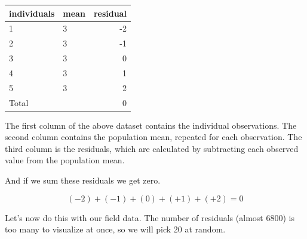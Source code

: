\documentclass[
]{book}
\newenvironment{Shaded}{\begin{snugshade}}{\end{snugshade}}
\newcommand{\AttributeTok}[1]{\textcolor[rgb]{0.77,0.63,0.00}{#1}}
\newcommand{\DecValTok}[1]{\textcolor[rgb]{0.00,0.00,0.81}{#1}}
\newcommand{\FunctionTok}[1]{\textcolor[rgb]{0.00,0.00,0.00}{#1}}
\newcommand{\NormalTok}[1]{#1}
\newcommand{\OtherTok}[1]{\textcolor[rgb]{0.56,0.35,0.01}{#1}}
\newcommand{\SpecialCharTok}[1]{\textcolor[rgb]{0.00,0.00,0.00}{#1}}
\newcommand{\StringTok}[1]{\textcolor[rgb]{0.31,0.60,0.02}{#1}}
\begin{document}
\begin{Shaded}
\end{Shaded}

\begin{tabular}[t]{l|l|r}
\hline
individuals & mean & residual\\
\hline
1 & 3 & -2\\
\hline
2 & 3 & -1\\
\hline
3 & 3 & 0\\
\hline
4 & 3 & 1\\
\hline
5 & 3 & 2\\
\hline
Total &  & 0\\
\hline
\end{tabular}

The first column of the above dataset contains the individual
observations. The second column contains the population mean, repeated
for each observation. The third column is the residuals, which are
calculated by subtracting each observed value from the population mean.

And if we sum these residuals we get zero.

\[ (-2) + (-1) + (0) + (+1) + (+2) = 0 \]

Let's now do this with our field data. The number of residuals (almost
6800) is too many to visualize at once, so we will pick 20 at random.
\end{document}
